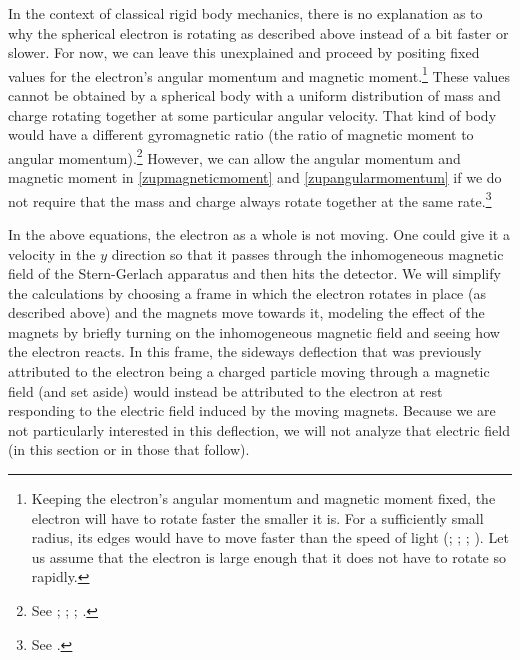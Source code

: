 \documentclass[onecolumn,secnumarabic,amsmath,amssymb,balancelastpage,nofootinbib]{article}
\begin{document}
In the context of classical rigid body mechanics, there is no explanation as to why the spherical electron is rotating as described above instead of a bit faster or slower.  For now, we can leave this unexplained and proceed by positing fixed values for the electron's angular momentum and magnetic moment.\footnote{Keeping the electron's angular momentum and magnetic moment fixed, the electron will have to rotate faster the smaller it is.  For a sufficiently small radius, its edges would have to move faster than the speed of light (\citealp[pg.\ 35]{tomonaga1997}; \citealp[problem 4.25]{griffithsQM}; \citealp[pg.\ 127]{rohrlich}; \citealp{howelectronsspin}).  Let us assume that the electron is large enough that it does not have to rotate so rapidly.}  These values cannot be obtained by a spherical body with a uniform distribution of mass and charge rotating together at some particular angular velocity.  That kind of body would have a different gyromagnetic ratio (the ratio of magnetic moment to angular momentum).\footnote{See \citet[pg.\ 47]{uhlenbeck}; \citet[pg.\ 39]{pais1989}; \citet[pg.\ 187]{jackson}; \citet[problem 5.58]{griffiths}.}  However, we can allow the angular momentum and magnetic moment in \eqref{zupmagneticmoment} and \eqref{zupangularmomentum} if we do not require that the mass and charge always rotate together at the same rate.\footnote{See \citet{howelectronsspin}.}

In the above equations, the electron as a whole is not moving.  One could give it a velocity in the $y$ direction so that it passes through the inhomogeneous magnetic field of the Stern-Gerlach apparatus and then hits the detector.  We will simplify the calculations by choosing a frame in which the electron rotates in place (as described above) and the magnets move towards it, modeling the effect of the magnets by briefly turning on the inhomogeneous magnetic field and seeing how the electron reacts.  In this frame, the sideways deflection that was previously attributed to the electron being a charged particle moving through a magnetic field (and set aside) would instead be attributed to the electron at rest responding to the electric field induced by the moving magnets.  Because we are not particularly interested in this deflection, we will not analyze that electric field (in this section or in those that follow).
\end{document}
